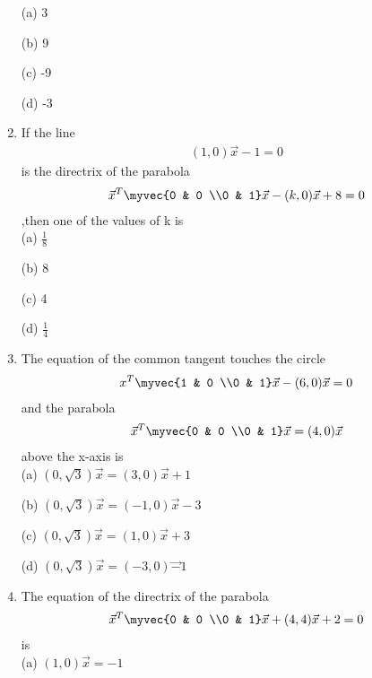 \begin{enumerate}
    \choice (a) 3
    
    \choice (b) 9
    
    \choice (c) -9
    
    \choice (d) -3\\
    
    \item If the line \begin{align}(1,0)\vec x-1=0\end{align}is the directrix of the parabola \begin{align}\vec x^T \myvec{0 & 0 \\0 & 1} \vec x-(k,0)\vec x +8=0\end{align},then one of the values of k is \\
    
    \choice (a) $\frac{1}{8}$
    
    \choice (b) 8
    
    \choice (c) 4
    
    \choice (d) $\frac{1}{4}$\\
    
    \item The equation of the common tangent touches the circle \begin{align}x^T\myvec{1 & 0 \\0 & 1}\vec x-(6,0)\vec x =0\end{align} and the parabola \begin{align}\vec x^T \myvec{0 & 0 \\0 & 1}\vec x=(4,0)\vec x\end{align} above the x-axis is \\
    
    \choice (a) $(0,\sqrt{3})\vec x=(3,0)\vec x+1$
    
    \choice (b) $(0,\sqrt{3})\vec x=(-1,0)\vec x-3$
    
    \choice (c) $(0,\sqrt{3})\vec x=(1,0)\vec x+3$
    
    \choice (d) $(0,\sqrt{3})\vec x=(-3,0)\vec -1$\\
    
    \item The equation of the directrix of the parabola \begin{align}\vec x^T \myvec {0 & 0 \\0 & 1}\vec x+(4,4)\vec x +2=0\end{align} is\\
    
    \choice (a) $(1,0)\vec x=-1$
    

\end{enumerate}
